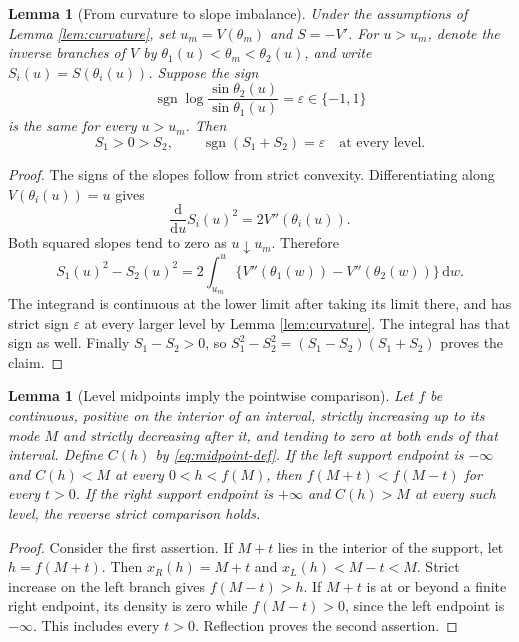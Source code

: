 \documentclass[11pt,a4paper]{article}
\newtheorem{lemma}[theorem]{Lemma}
\theoremstyle{definition}
\theoremstyle{remark}
\numberwithin{equation}{section}
\newcommand{\sign}{\operatorname{sgn}}
\begin{document}
\begin{lemma}[From curvature to slope imbalance]\label{lem:slopes}
Under the assumptions of Lemma \ref{lem:curvature}, set $u_m=V(\theta_m)$
and $S=-V'$. For $u>u_m$, denote the inverse branches of $V$ by
$\theta_1(u)<\theta_m<\theta_2(u)$, and write $S_i(u)=S(\theta_i(u))$.
Suppose the sign
\[
 \sign\log\frac{\sin\theta_2(u)}{\sin\theta_1(u)}
 =\varepsilon\in\{-1,1\}
\]
is the same for every $u>u_m$. Then
\begin{equation}\label{eq:slope-imbalance}
 S_1>0>S_2,\qquad \sign(S_1+S_2)=\varepsilon
 \quad\text{at every level}.
\end{equation}
\end{lemma}

\begin{proof}
The signs of the slopes follow from strict convexity. Differentiating
along $V(\theta_i(u))=u$ gives
\begin{equation}\label{eq:squared-slope}
 \frac{\mathrm d}{\mathrm du}S_i(u)^2=2V''(\theta_i(u)).
\end{equation}
Both squared slopes tend to zero as $u\downarrow u_m$. Therefore
\begin{equation}\label{eq:squared-integral}
 S_1(u)^2-S_2(u)^2
 =2\int_{u_m}^{u}
   \{V''(\theta_1(w))-V''(\theta_2(w))\}\,\mathrm dw .
\end{equation}
The integrand is continuous at the lower limit after taking its
limit there, and has strict sign $\varepsilon$ at every larger level
by Lemma \ref{lem:curvature}. The integral has that sign as well.
Finally $S_1-S_2>0$, so
$S_1^2-S_2^2=(S_1-S_2)(S_1+S_2)$ proves the claim.
\end{proof}

\begin{lemma}[Level midpoints imply the pointwise comparison]
\label{lem:geometry}
Let $f$ be continuous, positive on the interior of an interval,
strictly increasing up to its mode $M$ and strictly decreasing after
it, and tending to zero at both ends of that interval.
Define $C(h)$ by \eqref{eq:midpoint-def}.
If the left support endpoint is $-\infty$ and $C(h)<M$ at every
$0<h<f(M)$, then $f(M+t)<f(M-t)$ for every $t>0$.
If the right support endpoint is $+\infty$ and $C(h)>M$ at every
such level, the reverse strict comparison holds.
\end{lemma}

\begin{proof}
Consider the first assertion. If $M+t$ lies in the interior of the
support, let $h=f(M+t)$. Then $x_R(h)=M+t$ and
$x_L(h)<M-t<M$. Strict increase on the left branch gives
$f(M-t)>h$. If $M+t$ is at or beyond a finite right endpoint,
its density is zero while $f(M-t)>0$, since the left endpoint is
$-\infty$. This includes every $t>0$. Reflection proves the second
assertion.
\end{proof}
\end{document}
